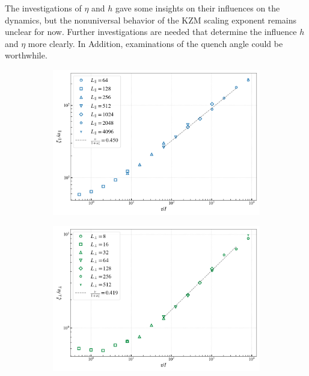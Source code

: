 	The investigations of $\eta$ and $h$ gave some insights on their influences on the dynamics, but the nonuniversal behavior of the KZM	scaling exponent remains unclear for now. Further investigations are needed that determine the influence $h$ and $\eta$ more clearly. In Addition, examinations of the quench angle could be worthwhile.
	\begin{figure}
	\begin{subfigure}{0.475\textwidth}
		\centering		\includegraphics[width=0.95\linewidth]{graphics/tau-xi-parallel-large-h3.png}
	\end{subfigure}
	\begin{subfigure}{0.475\textwidth}
		\centering		\includegraphics[width=0.96\linewidth]{graphics/tau-xi-perp-large-h3.png}
	\end{subfigure} \\ \par\bigskip

\end{figure}
